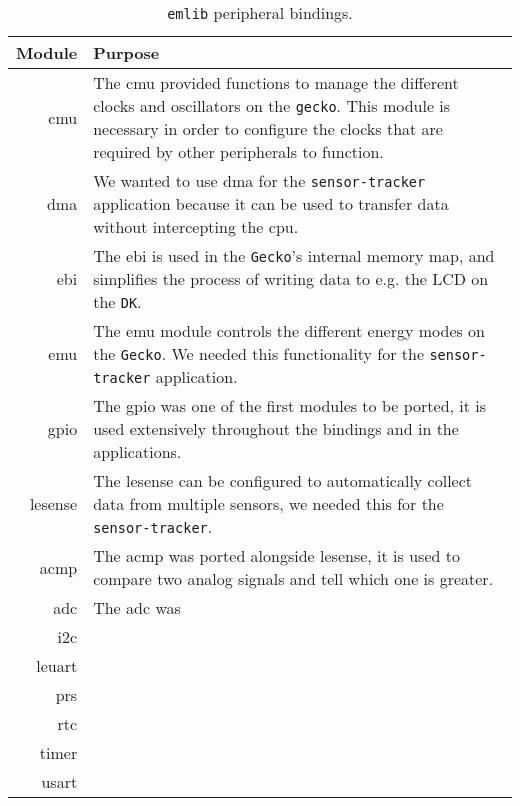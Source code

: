 \begin{table}[H]
  \centering
  \begin{tabular}{r|p{10cm}}
    \textbf{Module} & \textbf{Purpose} \\
    \hline
cmu     & The \gls{cmu} provided functions to manage the different clocks and oscillators on the \texttt{gecko}.
This module is necessary in order to configure the clocks that are required by other peripherals to function. \\

dma     & We wanted to use \gls{dma} for the \texttt{sensor-tracker} application because it can be used to transfer data without intercepting the \gls{cpu}. \\

ebi     & The \gls{ebi} is used in the \texttt{Gecko}'s internal memory map, and simplifies the process of writing data to e.g. the LCD on the \texttt{DK}. \\

emu     & The \gls{emu} module controls the different energy modes on the \texttt{Gecko}.
We needed this functionality for the \texttt{sensor-tracker} application. \\

gpio    & The \gls{gpio} was one of the first modules to be ported, it is used extensively throughout the bindings and in the applications. \\

lesense & The \gls{lesense} can be configured to automatically collect data from multiple sensors, we needed this for the \texttt{sensor-tracker}. \\

acmp    & The \gls{acmp} was ported alongside \gls{lesense}, it is used to compare two analog signals and tell which one is greater. \\

adc     & The \gls{adc} was  \\

i2c     &  \\

leuart  &  \\

prs     &  \\

rtc     &  \\

timer   &  \\

usart   &  \\

    \hline
  \end{tabular}

  \caption{\texttt{emlib} peripheral bindings.}
  \label{tab:emlib_peripheral_bindings}
\end{table}

